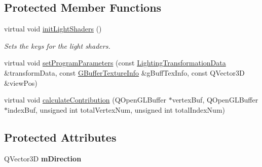 \subsection*{Protected Member Functions}
\begin{DoxyCompactItemize}
\item 
\mbox{\label{class_geometry_engine_1_1_geometry_world_item_1_1_geometry_light_1_1_directional_light_a0488db9f38fe4382ed9e1b73a4b4eff7}} 
virtual void \mbox{\hyperlink{class_geometry_engine_1_1_geometry_world_item_1_1_geometry_light_1_1_directional_light_a0488db9f38fe4382ed9e1b73a4b4eff7}{init\+Light\+Shaders}} ()
\begin{DoxyCompactList}\small\item\em Sets the keys for the light shaders. \end{DoxyCompactList}\item 
virtual void \mbox{\hyperlink{class_geometry_engine_1_1_geometry_world_item_1_1_geometry_light_1_1_directional_light_ae395d609ee47dd5d399514bb2c76d2db}{set\+Program\+Parameters}} (const \mbox{\hyperlink{struct_geometry_engine_1_1_lighting_transformation_data}{Lighting\+Transformation\+Data}} \&transform\+Data, const \mbox{\hyperlink{struct_geometry_engine_1_1_g_buffer_texture_info}{G\+Buffer\+Texture\+Info}} \&g\+Buff\+Tex\+Info, const Q\+Vector3D \&view\+Pos)
\item 
virtual void \mbox{\hyperlink{class_geometry_engine_1_1_geometry_world_item_1_1_geometry_light_1_1_directional_light_af1eac6f1aac9388efe95e1a898cf600f}{calculate\+Contribution}} (Q\+Open\+G\+L\+Buffer $\ast$vertex\+Buf, Q\+Open\+G\+L\+Buffer $\ast$index\+Buf, unsigned int total\+Vertex\+Num, unsigned int total\+Index\+Num)
\end{DoxyCompactItemize}
\subsection*{Protected Attributes}
\begin{DoxyCompactItemize}
\item 
\mbox{\label{class_geometry_engine_1_1_geometry_world_item_1_1_geometry_light_1_1_directional_light_aace75293443cfc30506d1d348fb856c3}} 
Q\+Vector3D {\bfseries m\+Direction}
\end{DoxyCompactItemize}


